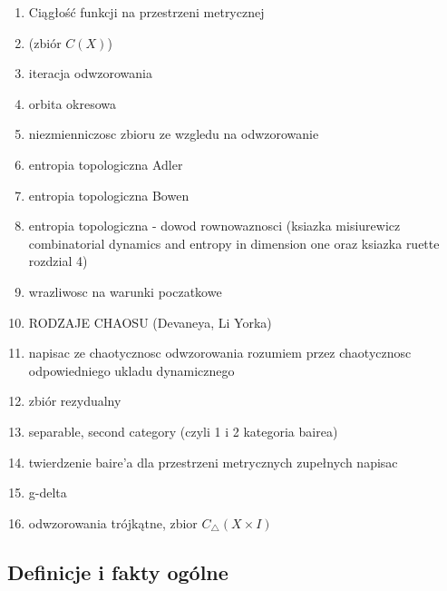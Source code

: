 \documentclass[licencjacka]{pwr_wmat_praca_dyplomowa}
\theoremstyle{plain}
\numberwithin{theorem}{chapter}
\theoremstyle{definition}
\numberwithin{theorem}{chapter}
\newtheorem{definition}[theorem]{Definicja}
\begin{document}
\begin{enumerate}
\item Ciągłość funkcji na przestrzeni metrycznej 
\item (zbiór $C(X)$)


\item iteracja odwzorowania
\item orbita okresowa
\item niezmienniczosc zbioru ze wzgledu na odwzorowanie


\item entropia topologiczna Adler
\item entropia topologiczna Bowen
\item entropia topologiczna - dowod rownowaznosci (ksiazka misiurewicz combinatorial dynamics and entropy in dimension one oraz ksiazka ruette rozdzial 4)

\item wrazliwosc na warunki poczatkowe
\item RODZAJE CHAOSU (Devaneya, Li Yorka)


\item napisac ze chaotycznosc odwzorowania rozumiem przez chaotycznosc odpowiedniego ukladu dynamicznego

\item zbiór rezydualny
\item separable, second category (czyli 1 i 2 kategoria bairea)
\item twierdzenie baire'a dla przestrzeni metrycznych zupełnych napisac
\item g-delta




\item odwzorowania trójkątne, zbior $C_\triangle(X \times I)$

\end{enumerate}



\subsection{Definicje i fakty ogólne}
\end{document}
